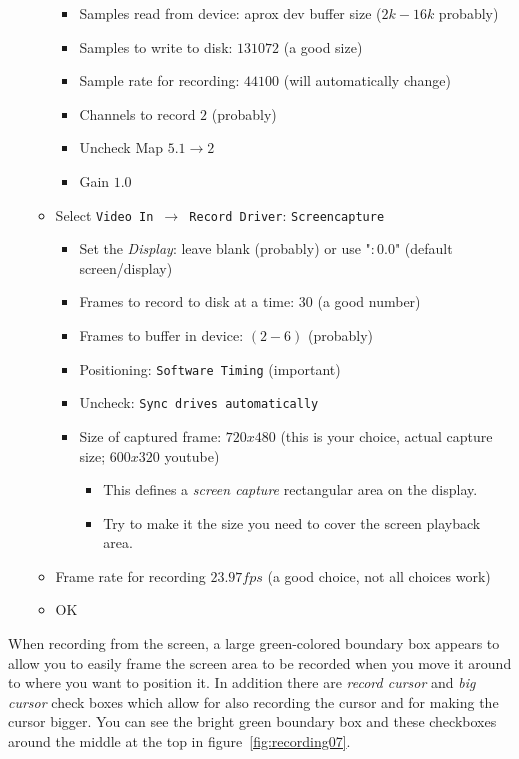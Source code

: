 \begin{enumerate}
\begin{itemize}
\begin{itemize}
            \item Samples read from device: aprox dev buffer size ($2k-16k$ probably)
            \item Samples to write to disk: $131072$ (a good size)
            \item Sample rate for recording: $44100$ (will automatically change)
            \item Channels to record $2$ (probably)
            \item Uncheck Map $5.1 \rightarrow 2$
            \item Gain $1.0$
        \end{itemize}
        \item Select \texttt{Video In $\rightarrow$ Record Driver}:  \texttt{Screencapture}
        \begin{itemize}
            \item Set the \textit{Display}: leave blank (probably) or use "$:0.0$" (default screen/display)
            \item Frames to record to disk at a time: $30$ (a good number)
            \item Frames to buffer in device: $(2-6)$ (probably)
            \item Positioning: \texttt{Software Timing} (important)
            \item Uncheck: \texttt{Sync drives automatically}
            \item Size of captured frame: $720x480$ (this is your choice, actual capture size; $600x320$ youtube)
            \begin{itemize}
                \item This defines a \textit{screen capture} rectangular area on the display.
                \item Try to make it the size you need to cover the screen playback area.
            \end{itemize}       
        \end{itemize}
        \item Frame rate for recording $23.97 fps$ (a good choice, not all choices work)
        \item OK
    \end{itemize}
    
\end{enumerate}

When recording from the screen, a large green-colored boundary box appears to allow you to easily frame the screen area to be recorded when you move it around to where you want to position it.  In addition there are \textit{record cursor} and \textit{big cursor} check boxes which allow for also recording the cursor and for making the cursor bigger. 
You can see the bright green boundary box and these checkboxes around the middle at the top in
figure~\ref{fig:recording07}.

